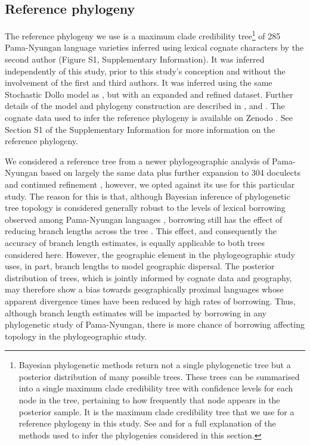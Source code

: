 \hypertarget{ref-phylogeny}{%
\subsection{Reference phylogeny}\label{ref-phylogeny}}

The reference phylogeny we use is a maximum clade credibility tree\footnote{Bayesian phylogenetic methods return not a single phylogenetic tree but a posterior distribution of many possible trees. These trees can be summarised into a single maximum clade credibility tree with confidence levels for each node in the tree, pertaining to how frequently that node appears in the posterior sample. It is the maximum clade credibility tree that we use for a reference phylogeny in this study. See \textcite{bowern_computational_2012} and \textcite{bouckaert_origin_2018} for a full explanation of the methods used to infer the phylogenies considered in this section.} of 285 Pama-Nyungan language varieties inferred using lexical cognate characters by the second author (Figure S1, Supplementary Information). It was inferred independently of this study, prior to this study's conception and without the involvement of the first and third authors. It was inferred using the same Stochastic Dollo model as \textcite{bowern_computational_2012}, but with an expanded and refined dataset. Further details of the model and phylogeny construction are described in \textcite{bowern_computational_2012}, \textcite{bowern_pama-nyungan_2015} and \textcite{bouckaert_origin_2018}. The cognate data used to infer the reference phylogeny is available on Zenodo \autocite{bowern_pama-nyungan_2018}. See Section S1 of the Supplementary Information for more information on the reference phylogeny.

We considered a reference tree from a newer phylogeographic analysis of Pama-Nyungan based on largely the same data plus further expansion to 304 doculects and continued refinement \autocite{bouckaert_origin_2018}, however, we opted against its use for this particular study. The reason for this is that, although Bayesian inference of phylogenetic tree topology is considered generally robust to the levels of lexical borrowing observed among Pama-Nyungan languages \autocites{greenhill_does_2009}{bowern_does_2011}, borrowing still has the effect of reducing branch lengths across the tree \autocite{greenhill_does_2009}. This effect, and consequently the accuracy of branch length estimates, is equally applicable to both trees considered here. However, the geographic element in the phylogeographic study uses, in part, branch lengths to model geographic dispersal. The posterior distribution of trees, which is jointly informed by cognate data and geography, may therefore show a bias towards geographically proximal languages whose apparent divergence times have been reduced by high rates of borrowing. Thus, although branch length estimates will be impacted by borrowing in any phylogenetic study of Pama-Nyungan, there is more chance of borrowing affecting topology in the phylogeographic study.

